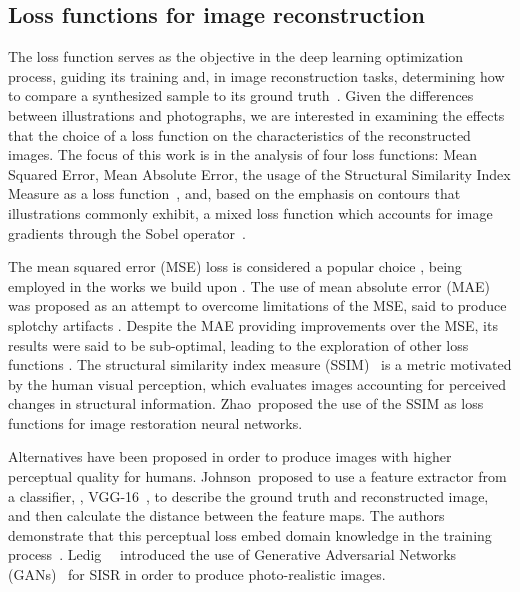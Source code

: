 \subsection{Loss functions for image reconstruction}

The loss function serves as the objective in the deep learning optimization process, guiding its training and, in image reconstruction tasks, determining how to compare a synthesized sample to its ground truth~\cite{zhao2016loss}. Given the differences between illustrations and photographs, we are interested in examining the effects that the choice of a loss function on the characteristics of the reconstructed images. The focus of this work is in the analysis of four loss functions: Mean Squared Error, Mean Absolute Error, the usage of the Structural Similarity Index Measure as a loss function~\cite{zhao2016loss}, and, based on the emphasis on contours that illustrations commonly exhibit, a mixed loss function which accounts for image gradients through the Sobel operator~\cite{lu2019single}.

The mean squared error (MSE) loss is considered a popular choice \cite{zhao2016loss}, being employed in the works we build upon \cite{dong2015image,shi2016realtime}. The use of mean absolute error (MAE) was proposed as an attempt to overcome limitations of the MSE, said to produce splotchy artifacts \cite{zhao2016loss}. Despite the MAE providing improvements over the MSE, its results were said to be sub-optimal, leading to the exploration of other loss functions \cite{zhao2016loss}. The structural similarity index measure (SSIM)~\cite{wang2004image} is a metric motivated by the human visual perception, which evaluates images accounting for perceived changes in structural information. Zhao~\etal proposed the use of the SSIM  as loss functions for image restoration neural networks.

Alternatives have been proposed in order to produce images with higher perceptual quality for humans. Johnson~\etal proposed to use a feature extractor from a classifier, \eg, VGG-16~\cite{simonyan2015deep}, to describe the ground truth and reconstructed image, and then calculate the distance between the feature maps. The authors demonstrate that this perceptual loss embed domain knowledge in the training process~\cite{johnson2016perceptual}. Ledig~\etal~\cite{ledig2017photorealistic} introduced the use of Generative Adversarial Networks (GANs)~\cite{goodfellow2014generative} for SISR in order to produce photo-realistic images.

